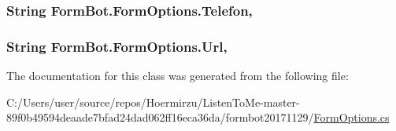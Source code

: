 \subsubsection[{\texorpdfstring{Telefon}{Telefon}}]{\setlength{\rightskip}{0pt plus 5cm}String Form\+Bot.\+Form\+Options.\+Telefon\hspace{0.3cm}{\ttfamily [get]}, {\ttfamily [set]}}\hypertarget{class_form_bot_1_1_form_options_ae426c2c8e13bbe1df18c4daad292a109}{}\label{class_form_bot_1_1_form_options_ae426c2c8e13bbe1df18c4daad292a109}
\subsubsection[{\texorpdfstring{Url}{Url}}]{\setlength{\rightskip}{0pt plus 5cm}String Form\+Bot.\+Form\+Options.\+Url\hspace{0.3cm}{\ttfamily [get]}, {\ttfamily [set]}}\hypertarget{class_form_bot_1_1_form_options_ac498f1514f8b793b205232b637411c0a}{}\label{class_form_bot_1_1_form_options_ac498f1514f8b793b205232b637411c0a}


The documentation for this class was generated from the following file\+:\begin{DoxyCompactItemize}
\item 
C\+:/\+Users/user/source/repos/\+Hoermirzu/\+Listen\+To\+Me-\/master-\/89f0b49594deaade7bfad24dad062ff16eca36da/formbot20171129/\hyperlink{_form_options_8cs}{Form\+Options.\+cs}\end{DoxyCompactItemize}
